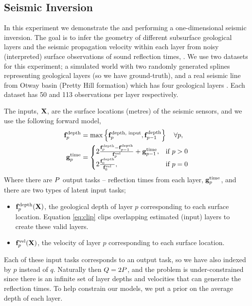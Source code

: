 \subsection{Seismic Inversion}

In this experiment we demonstrate the \eks and \uks performing a
one-dimensional seismic inversion. The goal is to infer the geometry of
different subsurface geological layers and the seismic propagation velocity
within each layer from noisy (interpreted) surface observations of sound
reflection times, \Outs. We use two datasets for this experiment; a simulated
world with two randomly generated splines representing geological layers (so we
have ground-truth), and a real seismic line from Otway basin (Pretty Hill
formation) which has four geological layers . Each dataset has 50
and 113 observations per layer respectively.

The inputs, $\mathbf{X}$, are the surface locations (metres) of the seismic sensors,
and we use the following forward model,
\begin{align}
    \mathbf{f}_p^\text{depth} &= \max\left\{{\mathbf{f}_p^\text{depth, input},
        \mathbf{f}_{p-1}^\text{depth}}\right\} \quad \forall p, \label{eq:clip} \\
    \mathbf{g}_p^\text{time} &=
    \begin{cases}
        2\frac{\mathbf{f}_p^\text{depth} - \mathbf{f}_{p-1}^\text{depth}}
        {\mathbf{f}_p^\text{vel}} + \mathbf{g}_{p-1}^\text{time},
        & \text{if } p > 0 \\
        2\frac{\mathbf{f}_0^\text{depth}}{\mathbf{f}_0^\text{vel}},
        & \text{if } p = 0
    \end{cases}
\end{align}
Where there are $P$ output tasks -- reflection times from each layer,
$\mathbf{g}_p^\text{time}$, and there are two types of latent input tasks;
\begin{itemize}
    \item $\mathbf{f}_p^\text{depth}\!\left({\mathbf{X}}\right)$, the geological depth of layer
        $p$ corresponding to each surface location. Equation \eqref{eq:clip} 
        clips overlapping estimated (input) layers to create these valid
        layers.
    \item $\mathbf{f}_p^\text{vel}\!\left({\mathbf{X}}\right)$, the velocity of layer $p$ 
        corresponding to each surface location.
\end{itemize}
Each of these input tasks corresponds to an output task, so we have also
indexed by $p$ instead of $q$. Naturally then $Q = 2P$, and the
problem is under-constrained since there is an infinite set of layer depths and
velocities that can generate the reflection times. To help constrain our
models, we put a prior on the average depth of each layer.

